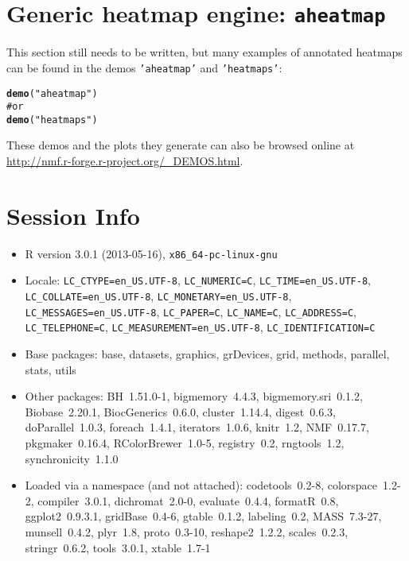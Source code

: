 \documentclass[a4paper]{article}\usepackage{graphicx, color}
\makeatletter
\newcommand{\hlfunctioncall}[1]{\textcolor[rgb]{0.501960784313725,0,0.329411764705882}{\textbf{#1}}}%
\newcommand{\hlstring}[1]{\textcolor[rgb]{0.6,0.6,1}{#1}}%
\newcommand{\hlcomment}[1]{\textcolor[rgb]{0.180392156862745,0.6,0.341176470588235}{#1}}%
\newenvironment{kframe}{%
 \def\at@end@of@kframe{}%
 \ifinner\ifhmode%
  \def\at@end@of@kframe{\end{minipage}}%
  \begin{minipage}{\columnwidth}%
 \fi\fi%
 \def\FrameCommand##1{\hskip\@totalleftmargin \hskip-\fboxsep
 \colorbox{shadecolor}{##1}\hskip-\fboxsep
     \hskip-\linewidth \hskip-\@totalleftmargin \hskip\columnwidth}%
 \MakeFramed {\advance\hsize-\width
   \@totalleftmargin\z@ \linewidth\hsize
   \@setminipage}}%
 {\par\unskip\endMakeFramed%
 \at@end@of@kframe}
\newenvironment{knitrout}{}{} %
\let\code=\texttt
\makeatother
\begin{document}
\section{Generic heatmap engine: \texttt{aheatmap}}
\label{sec:aheatmap}

This section still needs to be written, but many examples of annotated heatmaps can be found in the demos \code{'aheatmap'} and \code{'heatmaps'}:
\begin{knitrout}
\color{fgcolor}\begin{kframe}
\begin{alltt}
\hlfunctioncall{demo}(\hlstring{"aheatmap"})
\hlcomment{# or}
\hlfunctioncall{demo}(\hlstring{"heatmaps"})
\end{alltt}
\end{kframe}
\end{knitrout}


These demos and the plots they generate can also be browsed online at \url{http://nmf.r-forge.r-project.org/_DEMOS.html}.

\section{Session Info}
\begin{itemize}\raggedright
  \item R version 3.0.1 (2013-05-16), \verb|x86_64-pc-linux-gnu|
  \item Locale: \verb|LC_CTYPE=en_US.UTF-8|, \verb|LC_NUMERIC=C|, \verb|LC_TIME=en_US.UTF-8|, \verb|LC_COLLATE=en_US.UTF-8|, \verb|LC_MONETARY=en_US.UTF-8|, \verb|LC_MESSAGES=en_US.UTF-8|, \verb|LC_PAPER=C|, \verb|LC_NAME=C|, \verb|LC_ADDRESS=C|, \verb|LC_TELEPHONE=C|, \verb|LC_MEASUREMENT=en_US.UTF-8|, \verb|LC_IDENTIFICATION=C|
  \item Base packages: base, datasets, graphics, grDevices, grid,
    methods, parallel, stats, utils
  \item Other packages: BH~1.51.0-1, bigmemory~4.4.3,
    bigmemory.sri~0.1.2, Biobase~2.20.1, BiocGenerics~0.6.0,
    cluster~1.14.4, digest~0.6.3, doParallel~1.0.3, foreach~1.4.1,
    iterators~1.0.6, knitr~1.2, NMF~0.17.7, pkgmaker~0.16.4,
    RColorBrewer~1.0-5, registry~0.2, rngtools~1.2,
    synchronicity~1.1.0
  \item Loaded via a namespace (and not attached):
    codetools~0.2-8, colorspace~1.2-2, compiler~3.0.1,
    dichromat~2.0-0, evaluate~0.4.4, formatR~0.8, ggplot2~0.9.3.1,
    gridBase~0.4-6, gtable~0.1.2, labeling~0.2, MASS~7.3-27,
    munsell~0.4.2, plyr~1.8, proto~0.3-10, reshape2~1.2.2,
    scales~0.2.3, stringr~0.6.2, tools~3.0.1, xtable~1.7-1
\end{itemize}



\printbibliography[heading=bibintoc]
\end{document}
